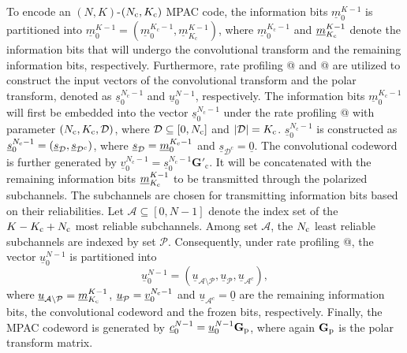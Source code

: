 \documentclass[12pt, draftclsnofoot, peerreview, onecolumn]{IEEEtran}
\makeatletter
\theoremstyle{noparent}
\newcommand{\Rmnum}[1]{\expandafter\@slowromancap\romannumeral #1@}
\makeatother
\begin{document}
To encode an $(N,K)$-$(N_{\rm c},K_{\rm c})$ MPAC code, 
the information bits $\underline{m}_{0}^{K-1}$ is partitioned into 
$\underline{m}_{0}^{K-1}=(\underline{m}_{0}^{K_{\mathrm c}-1}, \underline{m}_{K_{\mathrm c}}^{K-1})$,
where $\underline{m}_{0}^{K_{\mathrm c}-1}$ and $\underline{m}_{K_{\rm c}}^{K-1}$
denote the information bits that will undergo the convolutional transform and 
the remaining information bits, respectively.
Furthermore, rate profiling \Rmnum{1} and \Rmnum{2} are utilized
to construct the input vectors of the convolutional transform and 
the polar transform, denoted as $\underline{s}_{0}^{N_{\mathrm c}-1}$
and $\underline{u}_{0}^{N-1}$, respectively.
The information bits $\underline{m}_{0}^{K_{\mathrm c}-1}$
will first be embedded into the vector $\underline{s}_{0}^{N_{\mathrm c}-1}$
under the rate profiling \Rmnum{1} with parameter $(N_{\rm c},K_{\rm c},\mathcal{D})$,
where $\mathcal{D} \subseteq [0, N_{\rm c}]$ and $|\mathcal{D}|=K_{\rm c}$.
$\underline{s}_{0}^{N_{\mathrm c}-1}$ is constructed as
$\underline{s}_{0}^{N_{\rm c}-1}=(\underline{s}_{\mathcal{D}}, \underline{s}_{\mathcal{D}^c})$,
where $\underline{s}_{\mathcal{D}}=\underline{m}_{0}^{K_{\rm c}-1}$ and $\underline{s}_{\mathcal{D}^c}=\underline{0}$.
The convolutional codeword is further generated by 
$\underline{v}_{0}^{N_{\mathrm c}-1}=\underline{s}_{0}^{N_{\mathrm c}-1} \mathbf{G}'_{\mathrm{c}}$.
It will be concatenated with the remaining information bits $\underline{m}_{K_{\rm c}}^{K-1}$ to be 
transmitted through the polarized subchannels.
The subchannels are chosen for transmitting information bits based on their reliabilities.
Let $\mathcal{A} \subseteq [0, N-1]$ denote the index set of the 
$K-K_{\rm c}+N_{\rm c}$ most reliable subchannels.
Among set $\mathcal{A}$, the $N_{\rm c}$ least reliable subchannels
are indexed by set $\mathcal{P}$.
Consequently, under rate profiling \Rmnum{2}, the vector $\underline{u}_{0}^{N-1}$
is partitioned into 
\begin{equation}
    \underline{u}_{0}^{N-1} =(\underline{u}_{\mathcal{A}\setminus\mathcal{P}}, \underline{u}_{\mathcal{P}},\underline{u}_{\mathcal{A}^c}),
    \label{u_vector}
\end{equation}
where $\underline{u}_{\mathcal{A}\setminus \mathcal{P} }=\underline{m}_{K_{\rm c}}^{K-1}$, $\underline{u}_{\mathcal{P}}=\underline{v}_{0}^{N_{\rm c}-1}$
and $\underline{u}_{\mathcal{A}^c}=\underline{0}$ 
are the remaining information bits, 
the convolutional codeword and the frozen bits, respectively.
Finally, the MPAC codeword is generated by
$\underline{c}_{0}^{N-1}=\underline{u}_{0}^{N-1} \mathbf{G}_{\rm{p}}$, where again $\mathbf{G}_{\rm{p}}$ is the polar transform matrix.
\end{document}
